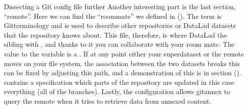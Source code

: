 \begin{findoutmore}[label={fom-gitconfig}, before title={\thetcbcounter\ }, float, floatplacement=tb, check odd page=true]{Dissecting a Git config file further}
\sphinxAtStartPar
Another interesting part is the last section, “remote”.
Here we can find the {\hyperref[\detokenize{glossary:term-sibling}]{}} “roommate” we defined
in {\hyperref[\detokenize{basics/101-121-siblings:sibling}]{}} (). The term {\hyperref[\detokenize{glossary:term-remote}]{}} is Git\sphinxhyphen{}terminology and is
used to describe other repositories or DataLad datasets that the
repository knows about.
This file, therefore, is where DataLad  the sibling
with , and thanks to it you can
collaborate with your room mate.
The value to the  variable is a . If at any point
either your superdataset or the remote moves on your file system,
the association between the two datasets breaks \textendash{} this can be fixed by adjusting this
path, and a demonstration of this is in section {\hyperref[\detokenize{basics/101-136-filesystem:file-system}]{}} ().
 contains a specification which parts of the repository are
updated \textendash{} in this case everything (all of the branches).
Lastly, the  configuration allows git\sphinxhyphen{}annex
to query the remote when it tries to retrieve data from annexed content.


\end{findoutmore}

\ignorespaces 

